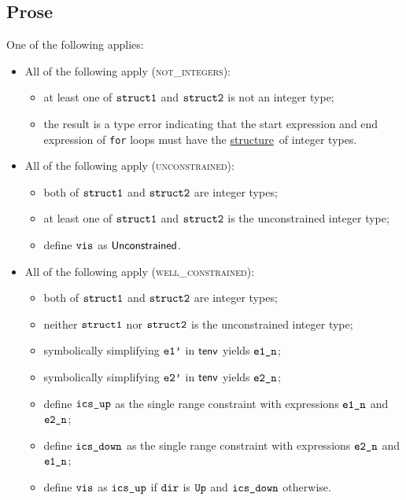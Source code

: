 \documentclass{book}
\newcommand\ProseOrTypeError[0]{\ProseTerminateAs{\TypeErrorConfig}}
\newcommand\structure[0]{\hyperlink{def-structure}{structure}}
\begin{document}
\subsection{Prose}
One of the following applies:
\begin{itemize}
  \item All of the following apply (\textsc{not\_integers}):
  \begin{itemize}
    \item at least one of $\texttt{struct1}$ and $\texttt{struct2}$ is not an integer type;
    \item the result is a type error indicating that the start expression and end expression of \texttt{for} loops
          must have the \structure\ of integer types.
  \end{itemize}

  \item All of the following apply (\textsc{unconstrained}):
  \begin{itemize}
    \item both of $\texttt{struct1}$ and $\texttt{struct2}$ are integer types;
    \item at least one of $\texttt{struct1}$ and $\texttt{struct2}$ is the unconstrained integer type;
    \item define $\texttt{vis}$ as $\textsf{Unconstrained}$.
  \end{itemize}

  \item All of the following apply (\textsc{well\_constrained}):
  \begin{itemize}
    \item both of $\texttt{struct1}$ and $\texttt{struct2}$ are integer types;
    \item neither $\texttt{struct1}$ nor $\texttt{struct2}$ is the unconstrained integer type;
    \item symbolically simplifying $\texttt{e1'}$ in $\textsf{tenv}$ yields $\texttt{e1\_n}$\ProseOrTypeError;
    \item symbolically simplifying $\texttt{e2'}$ in $\textsf{tenv}$ yields $\texttt{e2\_n}$\ProseOrTypeError;
    \item define $\texttt{ics\_up}$ as the single range constraint with expressions $\texttt{e1\_n}$ and $\texttt{e2\_n}$;
    \item define $\texttt{ics\_down}$ as the single range constraint with expressions $\texttt{e2\_n}$ and $\texttt{e1\_n}$;
    \item define $\texttt{vis}$ as $\texttt{ics\_up}$ if $\texttt{dir}$ is $\texttt{Up}$ and $\texttt{ics\_down}$ otherwise.
  \end{itemize}
\end{itemize}
\end{document}
